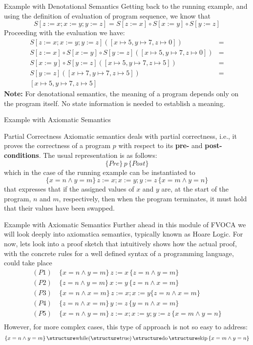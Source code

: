 \documentclass[aspectratio=169]{beamer}
\begin{document}
\begin{slide}{Example with Denotational Semantics}
Getting back to the running example, and using the definition of evaluation of program sequence, we know that $$S[z:= x; x:= y; y := z] = S[z:= x] \circ S[x:= y] \circ S[y := z]$$ Proceeding with the evaluation we have:
\begin{align*}
  S[z:= x; x:= y; y := z]([x \mapsto 5,y \mapsto 7,z \mapsto 0]) & =\\
  S[z:= x] \circ S[x:= y] \circ S[y := z]([x \mapsto 5,y \mapsto 7,z \mapsto 0]) & =\\
  S[x:= y] \circ S[y := z]([x \mapsto 5,y \mapsto 7,z \mapsto 5]) & =\\
  S[y := z]([x \mapsto 7,y \mapsto 7,z \mapsto 5]) & =\\
  [x \mapsto 5,y \mapsto 7,z \mapsto 5]
\end{align*}
{\bf Note:} For denotational semantics, the meaning of a program depends only on the program itself. No
state information is needed to establish a meaning.
\end{slide}


\begin{slide}{Example with Axiomatic Semantics}
  \begin{block}{Partial Correctness}
  Axiomatic semantics deals with partial correctness, i.e., it proves the correctness of a program $p$ with respect to its \textbf{pre-} and \textbf{post-conditions}. The usual representation is as follows: $$\{Pre\}\,p\,\{Post\}$$ which in the case of the running example can be instantiated to
  $$\{x = n \land y = m\}\,z:= x; x:= y; y := z\,\{x = m \land y = n\}$$ that expresses that if the assigned values of $x$ and $y$ are, at the start of the program, $n$ and $m$, respectively, then when the program terminates, it must hold that their values have been swapped.
  \end{block}
\end{slide}

\begin{slide}{Example with Axiomatic Semantics}
Further ahead in this module of FVOCA we will look deeply into axiomatica semantics, typically known as Hoare Logic. For now, lets look into a proof sketch that intuitively shows how the actual proof, with the concrete rules for a well defined syntax of a programming language, could take place
\begin{align*}
(P1)~ & \{x = n \land y = m\}\,z := x\,\{z = n \land y = m\} \\
(P2)~ & \{z = n \land y = m\}\,x := y\,\{z = n \land x = m\} \\
(P3)~ & \{x = n \land x = m\}\,z := x ; x := y\{z = n \land x = m\} \\
(P4)~ & \{z = n \land x = m\}\,y := z\,\{y = n \land x = m\} \\
(P5) & \{x = n \land y = m\}\,z:= x; x:= y; y := z\,\{x = m \land y = n\} \\
\end{align*}
However, for more complex cases, this type of approach is not so easy to address:
$$\{x = n \land y = m\}\,\kw{while}(\kw{true})\,\kw{do}\,\kw{skip}\,\{x = m \land y = n\}$$
\end{slide}
\end{document}
